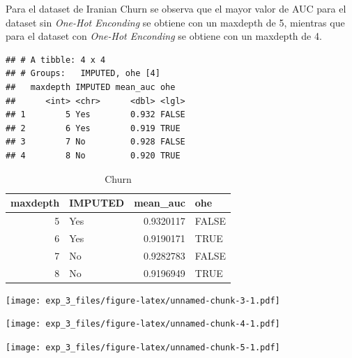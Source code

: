 \documentclass[
]{article}
\begin{document}
Para el dataset de Iranian Churn se observa que el mayor valor de AUC
para el dataset sin \emph{One-Hot Enconding} se obtiene con un maxdepth
de 5, mientras que para el dataset con \emph{One-Hot Enconding} se
obtiene con un maxdepth de 4.

\begin{verbatim}
## # A tibble: 4 x 4
## # Groups:   IMPUTED, ohe [4]
##   maxdepth IMPUTED mean_auc ohe  
##      <int> <chr>      <dbl> <lgl>
## 1        5 Yes        0.932 FALSE
## 2        6 Yes        0.919 TRUE 
## 3        7 No         0.928 FALSE
## 4        8 No         0.920 TRUE
\end{verbatim}

\begin{table}

\caption{\label{tab:unnamed-chunk-2}Churn}
\centering
\begin{tabular}[t]{rlrl}
\toprule
maxdepth & IMPUTED & mean\_auc & ohe\\
\midrule
5 & Yes & 0.9320117 & FALSE\\
6 & Yes & 0.9190171 & TRUE\\
7 & No & 0.9282783 & FALSE\\
8 & No & 0.9196949 & TRUE\\
\bottomrule
\end{tabular}
\end{table}

\texttt{[image: exp\_3\_files/figure-latex/unnamed-chunk-3-1.pdf]}

\texttt{[image: exp\_3\_files/figure-latex/unnamed-chunk-4-1.pdf]}

\texttt{[image: exp\_3\_files/figure-latex/unnamed-chunk-5-1.pdf]}
\end{document}
